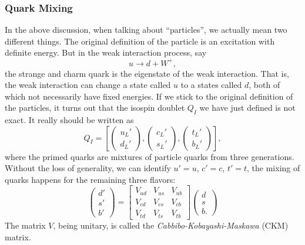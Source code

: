 \documentclass[aps,prb,superscriptaddress,nofootinbib]{revtex4}
\begin{document}
\subsubsection{Quark Mixing}
In the above discussion, when talking about ``particles'', we actually mean two different things. 
The original definition of the particle is an excitation with definite energy.
But in the weak interaction process, say
\begin{equation}
	u \rightarrow d + W^+,
\end{equation}
the strange and charm quark is the eigenstate of the weak interaction.
That is, the weak interaction can change a state called $u$ to a states called $d$, both of which not necessarily have fixed energies.
If we stick to the original definition of the particles, it turns out that the isospin doublet $Q_I$ we have just defined is not exact.
It really should be written as
\begin{equation}
	Q_I = \left[
		\begin{pmatrix} u_L' \\ d_L' \end{pmatrix},
		\begin{pmatrix} c_L' \\ s_L' \end{pmatrix},
		\begin{pmatrix} t_L' \\ b_L' \end{pmatrix}
	\right],
\end{equation}
where the primed quarks are mixtures of particle quarks from three generations.
Without the loss of generality, we can identify $u'=u$, $c'=c$, $t'=t$, the mixing of quarks happens for the remaining three flavors:
\begin{equation}
	\begin{pmatrix}
		d' \\ s' \\ b'
	\end{pmatrix}
	= \begin{bmatrix}
		V_{ud} & V_{us} & V_{ub} \\
		V_{cd} & V_{cs} & V_{cb} \\
		V_{td} & V_{ts} & V_{tb}
	\end{bmatrix}
	\begin{pmatrix}
		d \\ s \\ b.
	\end{pmatrix}
\end{equation}
The matrix $V$, being unitary, is called the \textit{Cabbibo-Kobayashi-Maskawa} (CKM) matrix.
\end{document}
